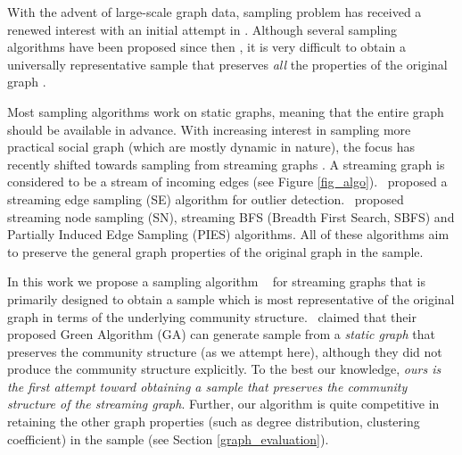 With the advent of large-scale graph data, sampling problem has received a renewed interest with an initial attempt in \cite{leskovec2006sampling}. Although several sampling algorithms have been proposed since then \cite{ribeiro2010estimating,rasti2009respondent}, it is very difficult to obtain a universally representative sample that preserves {\em all} the properties of the original graph \cite{ahmed2010reconsidering,maiya2010sampling,maiya2011benefits}. 

Most sampling algorithms work on static graphs, meaning that the entire graph should be available in advance. With increasing interest in sampling more practical social graph (which are mostly dynamic in nature), the focus has recently shifted towards sampling from streaming graphs \cite{henzinger1998computing}. A streaming graph is considered to be a stream of incoming edges (see Figure  \ref{fig_algo}).~\cite{aggarwal2011outlier} proposed a streaming edge sampling (SE) algorithm for outlier detection.~\cite{ahmed2014network} proposed streaming node sampling (SN), streaming BFS (Breadth First Search, SBFS) and Partially Induced Edge Sampling (PIES) algorithms. All of these algorithms aim to preserve the general graph properties of the original graph in the sample.




In this work we propose a sampling algorithm \compas~ for streaming graphs that is primarily designed to obtain a sample which is most representative of the original graph in terms of the underlying community structure.~\cite{tong2016novel} claimed that their proposed Green Algorithm (GA) can generate sample from a {\em static graph} that preserves the community structure (as we attempt here), although they did not produce the community structure explicitly. To the best our knowledge, {\em ours is the first attempt toward obtaining a sample that preserves the community structure of the streaming graph}. Further, our algorithm is quite competitive in retaining the other graph properties (such as degree distribution, clustering coefficient) in the sample (see Section \ref{graph_evaluation}). 

